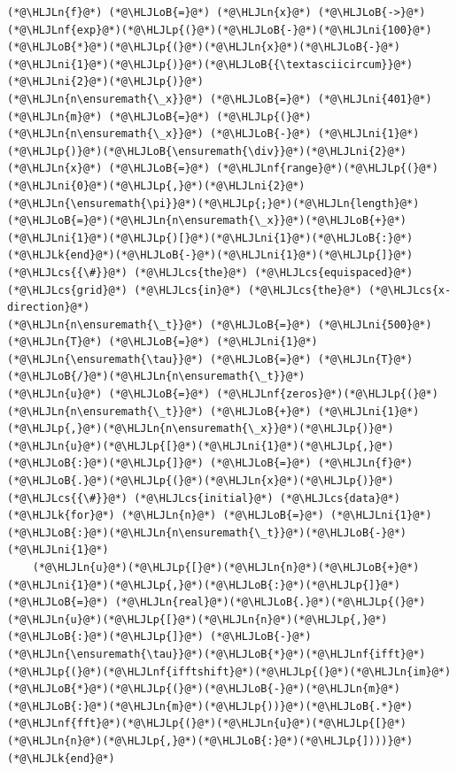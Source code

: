 \documentclass[12pt,landscape]{article}
\newcommand{\HLJLk}[1]{\textcolor[RGB]{148,91,176}{\textbf{#1}}}
\newcommand{\HLJLn}[1]{#1}
\newcommand{\HLJLnf}[1]{\textcolor[RGB]{66,102,213}{#1}}
\newcommand{\HLJLni}[1]{\textcolor[RGB]{59,151,46}{#1}}
\newcommand{\HLJLoB}[1]{\textcolor[RGB]{102,102,102}{\textbf{#1}}}
\newcommand{\HLJLp}[1]{#1}
\newcommand{\HLJLcs}[1]{\textcolor[RGB]{153,153,119}{\textit{#1}}}
\begin{document}
{\begin{lstlisting}
(*@\HLJLn{f}@*) (*@\HLJLoB{=}@*) (*@\HLJLn{x}@*) (*@\HLJLoB{->}@*) (*@\HLJLnf{exp}@*)(*@\HLJLp{(}@*)(*@\HLJLoB{-}@*)(*@\HLJLni{100}@*)(*@\HLJLoB{*}@*)(*@\HLJLp{(}@*)(*@\HLJLn{x}@*)(*@\HLJLoB{-}@*)(*@\HLJLni{1}@*)(*@\HLJLp{)}@*)(*@\HLJLoB{{\textasciicircum}}@*)(*@\HLJLni{2}@*)(*@\HLJLp{)}@*)
(*@\HLJLn{n\ensuremath{\_x}}@*) (*@\HLJLoB{=}@*) (*@\HLJLni{401}@*)
(*@\HLJLn{m}@*) (*@\HLJLoB{=}@*) (*@\HLJLp{(}@*)(*@\HLJLn{n\ensuremath{\_x}}@*) (*@\HLJLoB{-}@*) (*@\HLJLni{1}@*)(*@\HLJLp{)}@*)(*@\HLJLoB{\ensuremath{\div}}@*)(*@\HLJLni{2}@*)
(*@\HLJLn{x}@*) (*@\HLJLoB{=}@*) (*@\HLJLnf{range}@*)(*@\HLJLp{(}@*)(*@\HLJLni{0}@*)(*@\HLJLp{,}@*)(*@\HLJLni{2}@*)(*@\HLJLn{\ensuremath{\pi}}@*)(*@\HLJLp{;}@*)(*@\HLJLn{length}@*)(*@\HLJLoB{=}@*)(*@\HLJLn{n\ensuremath{\_x}}@*)(*@\HLJLoB{+}@*)(*@\HLJLni{1}@*)(*@\HLJLp{)[}@*)(*@\HLJLni{1}@*)(*@\HLJLoB{:}@*)(*@\HLJLk{end}@*)(*@\HLJLoB{-}@*)(*@\HLJLni{1}@*)(*@\HLJLp{]}@*) (*@\HLJLcs{{\#}}@*) (*@\HLJLcs{the}@*) (*@\HLJLcs{equispaced}@*) (*@\HLJLcs{grid}@*) (*@\HLJLcs{in}@*) (*@\HLJLcs{the}@*) (*@\HLJLcs{x-direction}@*)
(*@\HLJLn{n\ensuremath{\_t}}@*) (*@\HLJLoB{=}@*) (*@\HLJLni{500}@*)
(*@\HLJLn{T}@*) (*@\HLJLoB{=}@*) (*@\HLJLni{1}@*)
(*@\HLJLn{\ensuremath{\tau}}@*) (*@\HLJLoB{=}@*) (*@\HLJLn{T}@*)(*@\HLJLoB{/}@*)(*@\HLJLn{n\ensuremath{\_t}}@*)
(*@\HLJLn{u}@*) (*@\HLJLoB{=}@*) (*@\HLJLnf{zeros}@*)(*@\HLJLp{(}@*)(*@\HLJLn{n\ensuremath{\_t}}@*) (*@\HLJLoB{+}@*) (*@\HLJLni{1}@*)(*@\HLJLp{,}@*)(*@\HLJLn{n\ensuremath{\_x}}@*)(*@\HLJLp{)}@*)
(*@\HLJLn{u}@*)(*@\HLJLp{[}@*)(*@\HLJLni{1}@*)(*@\HLJLp{,}@*)(*@\HLJLoB{:}@*)(*@\HLJLp{]}@*) (*@\HLJLoB{=}@*) (*@\HLJLn{f}@*)(*@\HLJLoB{.}@*)(*@\HLJLp{(}@*)(*@\HLJLn{x}@*)(*@\HLJLp{)}@*)  (*@\HLJLcs{{\#}}@*) (*@\HLJLcs{initial}@*) (*@\HLJLcs{data}@*)
(*@\HLJLk{for}@*) (*@\HLJLn{n}@*) (*@\HLJLoB{=}@*) (*@\HLJLni{1}@*)(*@\HLJLoB{:}@*)(*@\HLJLn{n\ensuremath{\_t}}@*)(*@\HLJLoB{-}@*)(*@\HLJLni{1}@*)
    (*@\HLJLn{u}@*)(*@\HLJLp{[}@*)(*@\HLJLn{n}@*)(*@\HLJLoB{+}@*)(*@\HLJLni{1}@*)(*@\HLJLp{,}@*)(*@\HLJLoB{:}@*)(*@\HLJLp{]}@*) (*@\HLJLoB{=}@*) (*@\HLJLn{real}@*)(*@\HLJLoB{.}@*)(*@\HLJLp{(}@*)(*@\HLJLn{u}@*)(*@\HLJLp{[}@*)(*@\HLJLn{n}@*)(*@\HLJLp{,}@*)(*@\HLJLoB{:}@*)(*@\HLJLp{]}@*) (*@\HLJLoB{-}@*) (*@\HLJLn{\ensuremath{\tau}}@*)(*@\HLJLoB{*}@*)(*@\HLJLnf{ifft}@*)(*@\HLJLp{(}@*)(*@\HLJLnf{ifftshift}@*)(*@\HLJLp{(}@*)(*@\HLJLn{im}@*)(*@\HLJLoB{*}@*)(*@\HLJLp{(}@*)(*@\HLJLoB{-}@*)(*@\HLJLn{m}@*)(*@\HLJLoB{:}@*)(*@\HLJLn{m}@*)(*@\HLJLp{))}@*)(*@\HLJLoB{.*}@*)(*@\HLJLnf{fft}@*)(*@\HLJLp{(}@*)(*@\HLJLn{u}@*)(*@\HLJLp{[}@*)(*@\HLJLn{n}@*)(*@\HLJLp{,}@*)(*@\HLJLoB{:}@*)(*@\HLJLp{])))}@*)
(*@\HLJLk{end}@*)
\end{lstlisting}


}
\end{document}
